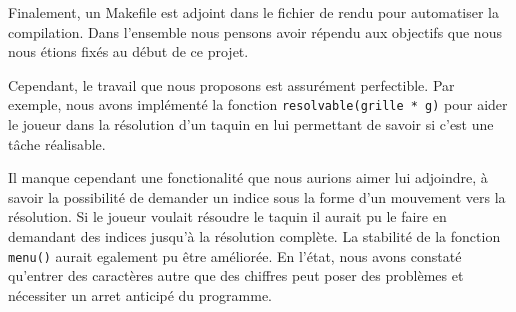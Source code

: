 \documentclass{article}
\begin{document}
Finalement, un Makefile est adjoint dans le fichier de rendu pour automatiser la compilation. Dans l'ensemble nous pensons avoir répendu aux objectifs que nous nous étions fixés au début de ce projet. 

Cependant, le travail que nous proposons est assurément perfectible. Par exemple, nous avons implémenté la fonction \texttt{resolvable(grille * g)} pour aider le joueur dans la résolution d'un taquin en lui permettant de savoir si c'est une tâche réalisable. 

Il manque cependant une fonctionalité  que nous aurions aimer lui adjoindre, à savoir la possibilité de demander un indice sous la forme d'un mouvement vers la résolution. Si le joueur voulait résoudre le taquin il aurait pu le faire en demandant des indices jusqu'à la résolution complète. La stabilité de la fonction \texttt{menu()} aurait egalement pu être améliorée. En l'état, nous avons constaté qu'entrer des caractères autre que des chiffres peut poser des problèmes et nécessiter un arret anticipé du programme.
\end{document}
